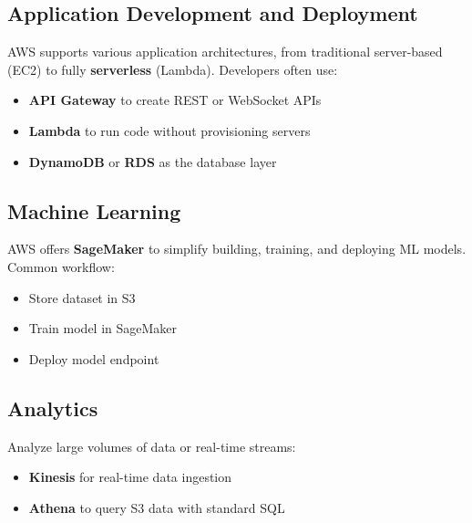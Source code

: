 \documentclass[11pt]{article}
\begin{document}
\subsection{Application Development and Deployment}
AWS supports various application architectures, from traditional server-based (EC2) to fully \textbf{serverless} (Lambda). Developers often use:
\begin{itemize}
    \item \textbf{API Gateway} to create REST or WebSocket APIs
    \item \textbf{Lambda} to run code without provisioning servers
    \item \textbf{DynamoDB} or \textbf{RDS} as the database layer
\end{itemize}

\begin{center}
\end{center}

\subsection{Machine Learning}
AWS offers \textbf{SageMaker} to simplify building, training, and deploying ML models. Common workflow:
\begin{itemize}
    \item Store dataset in S3
    \item Train model in SageMaker
    \item Deploy model endpoint
\end{itemize}

\subsection{Analytics}
Analyze large volumes of data or real-time streams:
\begin{itemize}
    \item \textbf{Kinesis} for real-time data ingestion
    \item \textbf{Athena} to query S3 data with standard SQL
\end{itemize}
\end{document}
